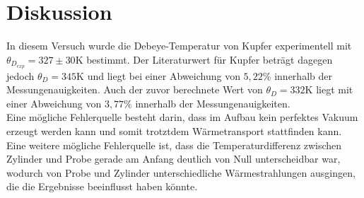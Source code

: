\section{Diskussion}
In diesem Versuch wurde die Debeye-Temperatur von Kupfer experimentell mit $\theta_{D_{exp}} = 327 \pm 30 \si{\kelvin}$ bestimmt. 
Der Literaturwert für Kupfer beträgt dagegen jedoch $\theta_{D} = 345 \si{\kelvin}$ und liegt bei einer Abweichung von $5,22 \%$ innerhalb der Messungenauigkeiten. 
Auch der zuvor berechnete Wert von $\theta_{D} = 332 \si{\kelvin}$ liegt mit einer Abweichung von $3,77\%$ innerhalb der Messungenauigkeiten. \\
Eine mögliche Fehlerquelle besteht darin, dass im Aufbau kein perfektes Vakuum erzeugt werden kann und somit trotztdem Wärmetransport stattfinden kann. \\
Eine weitere mögliche Fehlerquelle ist, dass die Temperaturdifferenz zwischen Zylinder und Probe gerade am Anfang deutlich von Null unterscheidbar war, wodurch von Probe und Zylinder unterschiedliche Wärmestrahlungen ausgingen, die die Ergebnisse beeinflusst haben könnte.